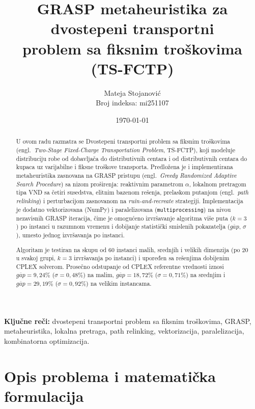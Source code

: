 \documentclass[12pt,a4paper]{article}
\title{\textbf{GRASP metaheuristika za dvostepeni transportni\\
problem sa fiksnim troškovima (TS-FCTP)}}
\author{Mateja Stojanović \\ Broj indeksa: mi251107}
\date{\today}
\begin{document}
\maketitle
\thispagestyle{empty}

\begin{abstract}
U ovom radu razmatra se Dvostepeni transportni problem sa fiksnim troškovima
(engl.\ \textit{Two-Stage Fixed-Charge Transportation Problem}, TS-FCTP),
koji modeluje distribuciju robe od dobavljača do distributivnih centara
i od distributivnih centara do kupaca uz varijabilne i fiksne troškove transporta.
Predložena je i implementirana metaheuristika zasnovana na GRASP pristupu
(engl.\ \textit{Greedy Randomized Adaptive Search Procedure}) sa nizom
proširenja: reaktivnim parametrom $\alpha$, lokalnom pretragom tipa VND
sa četiri susedstva, elitnim bazenom rešenja, prelaskom putanjom
(engl.\ \textit{path relinking}) i perturbacijom zasnovanom na
\textit{ruin-and-recreate} strategiji. Implementacija je dodatno
vektorizovana (NumPy) i paralelizovana (\texttt{multiprocessing}) na nivou
nezavisnih GRASP iteracija, čime je omogućeno izvršavanje algoritma više
puta ($k=3$) po instanci u razumnom vremenu i dobijanje statistički
smislenih pokazatelja ($\overline{gap}$, $\sigma$), umesto jednog
izvršavanja po instanci.

Algoritam je testiran na skupu od $60$ instanci malih, srednjih i velikih
dimenzija (po $20$ u svakoj grupi, $k=3$ izvršavanja po instanci) i
upoređen sa rešenjima dobijenim CPLEX solverom. Prosečno odstupanje od
CPLEX referentne vrednosti iznosi $\overline{gap}=9{,}24\%$
($\sigma=0{,}48\%$) na malim, $\overline{gap}=18{,}72\%$ ($\sigma=0{,}71\%$)
na srednjim i $\overline{gap}=29{,}19\%$ ($\sigma=0{,}92\%$) na velikim
instancama.
\end{abstract}
\vspace{50pt}
\textbf{Ključne reči:} dvostepeni transportni problem sa fiksnim troškovima,
GRASP, metaheuristika, lokalna pretraga, path relinking, vektorizacija,
paralelizacija, kombinatorna optimizacija.

\newpage
\tableofcontents
\newpage

\section{Opis problema i matematička formulacija}
\end{document}
